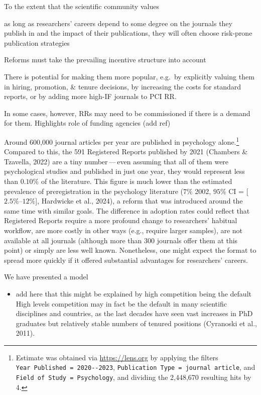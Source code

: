 \documentclass[
  ,man,mask,floatsintext]{apa6}
\providecommand{\tightlist}{%
  \setlength{\itemsep}{0pt}\setlength{\parskip}{0pt}}
\begin{document}
To the extent that the scientific community values

as long as researchers' careers depend to some degree on the journals they publish in and the impact of their publications, they will often choose risk-prone publication strategies

Reforms must take the prevailing incentive structure into account

There is potential for making them more popular, e.g.~by explicitly valuing them in hiring, promotion, \& tenure decisions, by increasing the costs for standard reports, or by adding more high-IF journals to PCI RR.

In some cases, however, RRs may need to be commissioned if there is a demand for them. Highlights role of funding agencies (add ref)

Around 600,000 journal articles per year are published in psychology alone.\footnote{Estimate was obtained via \url{https://lens.org} by applying the filters \texttt{Year\ Published\ =\ 2020-\/-2023}, \texttt{Publication\ Type\ =\ journal\ article}, and \texttt{Field\ of\ Study\ =\ Psychology}, and dividing the 2,448,670 resulting hits by 4.}
Compared to this, the 591 Registered Reports published by 2021 (Chambers \& Tzavella, 2022) are a tiny number\(\,\)---\(\,\)even assuming that all of them were psychological studies and published in just one year, they would represent less than \(0.10\%\) of the literature.
This figure is much lower than the estimated prevalence of preregistration in the psychology literature (\(7\%\) 2002, \(95\%\) CI = {[}\(2.5\%\)--\(12\%\){]}, Hardwicke et al., 2024), a reform that was introduced around the same time with similar goals.
The difference in adoption rates could reflect that Registered Reports require a more profound change to researchers' habitual workflow, are more costly in other ways (e.g., require larger samples), are not available at all journals (although more than 300 journals offer them at this point) or simply are less well known.
Nonetheless, one might expect the format to spread more quickly if it offered substantial advantages for researchers' careers.

We have presented a model

\begin{itemize}
\tightlist
\item
  add here that this might be explained by high competition being the default
  High levels competition may in fact be the default in many scientific disciplines and countries, as the last decades have seen vast increases in PhD graduates but relatively stable numbers of tenured positions (Cyranoski et al., 2011).
\end{itemize}
\end{document}
